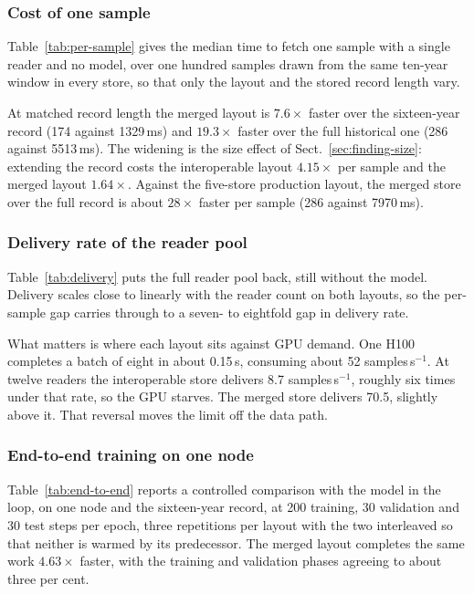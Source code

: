 \documentclass[gmd, manuscript]{copernicus}
\begin{document}
\subsubsection{Cost of one sample}

Table~\ref{tab:per-sample} gives the median time to fetch one sample with a single reader and
no model, over one hundred samples drawn from the same ten-year window in every store, so that
only the layout and the stored record length vary.

At matched record length the merged layout is $7.6\times$ faster over the sixteen-year record
(174 against 1329\,ms) and $19.3\times$ faster over the full historical one (286 against
5513\,ms). The widening is the size effect of Sect.~\ref{sec:finding-size}: extending the
record costs the interoperable layout $4.15\times$ per sample and the merged layout
$1.64\times$. Against the five-store production layout, the merged store over the full record
is about $28\times$ faster per sample (286 against 7970\,ms).

\subsubsection{Delivery rate of the reader pool}

Table~\ref{tab:delivery} puts the full reader pool back, still without the model. Delivery
scales close to linearly with the reader count on both layouts, so the per-sample gap carries
through to a seven- to eightfold gap in delivery rate.

What matters is where each layout sits against GPU demand. One H100 completes a batch of eight
in about 0.15\,s, consuming about 52 samples\,s$^{-1}$. At twelve readers the interoperable
store delivers 8.7 samples\,s$^{-1}$, roughly six times under that rate, so the GPU starves.
The merged store delivers 70.5, slightly above it. That reversal moves the limit off the data
path.

\subsubsection{End-to-end training on one node}

Table~\ref{tab:end-to-end} reports a controlled comparison with the model in the loop, on one
node and the sixteen-year record, at 200 training, 30 validation and 30 test steps per epoch,
three repetitions per layout with the two interleaved so that neither is warmed by its
predecessor. The merged layout completes the same work $4.63\times$ faster, with the training
and validation phases agreeing to about three per cent.
\end{document}
